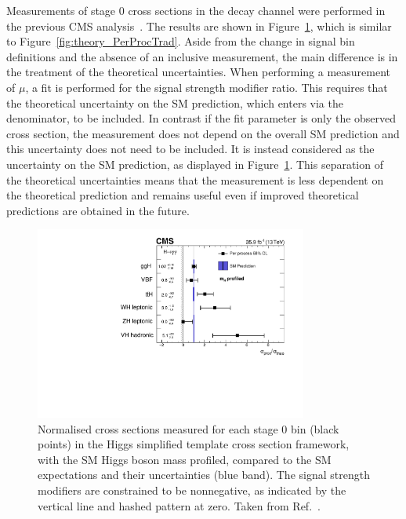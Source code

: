 Measurements of stage 0 cross sections in the \Hgg decay channel 
were performed in the previous CMS \Hgg analysis~\cite{HIG-16-040}.
The results are shown in Figure~\ref{fig:theory_PerProcSTXS}, 
which is similar to Figure~\ref{fig:theory_PerProcTrad}.
Aside from the change in signal bin definitions and the absence of an inclusive measurement, 
the main difference is in the treatment of the theoretical uncertainties.
When performing a measurement of $\mu$, 
a fit is performed for the signal strength modifier ratio. 
This requires that the theoretical uncertainty on the SM prediction, 
which enters via the denominator, to be included.
In contrast if the fit parameter is only the observed cross section, 
the measurement does not depend on the overall SM prediction 
and this uncertainty does not need to be included.
It is instead considered as the uncertainty on the SM prediction, 
as displayed in Figure~\ref{fig:theory_PerProcSTXS}.
This separation of the theoretical uncertainties means that the measurement is less dependent 
on the theoretical prediction and remains useful 
even if improved theoretical predictions are obtained in the future.

\begin{figure}[hptb]
\centering
\includegraphics[width=0.8\textwidth]{Figures/Theory/PerProcSTXS.pdf}
\caption{
  Normalised cross sections measured for each stage 0 bin (black points) 
  in the Higgs simplified template cross section framework, 
  with the SM Higgs boson mass profiled, 
  compared to the SM expectations and their uncertainties (blue band). 
  The signal strength modifiers are constrained to be nonnegative, 
  as indicated by the vertical line and hashed pattern at zero.
  Taken from Ref.~\cite{HIG-16-040}.
}
\label{fig:theory_PerProcSTXS}
\end{figure}

